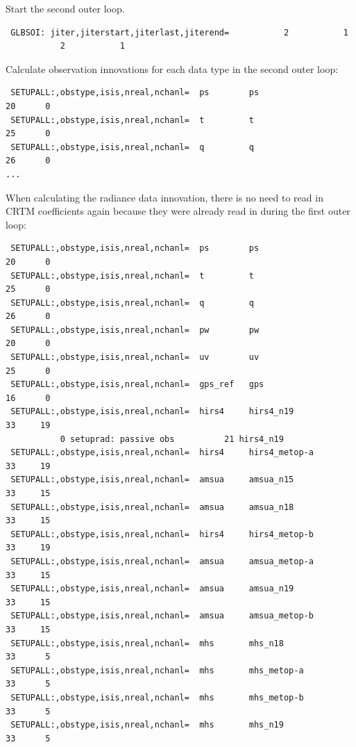 Start the second outer loop.
\begin{scriptsize}
\begin{verbatim}
 GLBSOI: jiter,jiterstart,jiterlast,jiterend=           2           1
           2           1
\end{verbatim}
\end{scriptsize}
Calculate observation innovations for each data type in the second outer loop:
\begin{scriptsize}
\begin{verbatim}
 SETUPALL:,obstype,isis,nreal,nchanl=  ps        ps                       20      0
 SETUPALL:,obstype,isis,nreal,nchanl=  t         t                        25      0
 SETUPALL:,obstype,isis,nreal,nchanl=  q         q                        26      0
...
\end{verbatim}
\end{scriptsize}

When calculating the radiance data innovation, there is no need to read in CRTM coefficients again because they were already read in during the first outer loop: 
\begin{scriptsize}
\begin{verbatim}
 SETUPALL:,obstype,isis,nreal,nchanl=  ps        ps                       20      0
 SETUPALL:,obstype,isis,nreal,nchanl=  t         t                        25      0
 SETUPALL:,obstype,isis,nreal,nchanl=  q         q                        26      0
 SETUPALL:,obstype,isis,nreal,nchanl=  pw        pw                       20      0
 SETUPALL:,obstype,isis,nreal,nchanl=  uv        uv                       25      0
 SETUPALL:,obstype,isis,nreal,nchanl=  gps_ref   gps                      16      0
 SETUPALL:,obstype,isis,nreal,nchanl=  hirs4     hirs4_n19                33     19
           0 setuprad: passive obs          21 hirs4_n19
 SETUPALL:,obstype,isis,nreal,nchanl=  hirs4     hirs4_metop-a            33     19
 SETUPALL:,obstype,isis,nreal,nchanl=  amsua     amsua_n15                33     15
 SETUPALL:,obstype,isis,nreal,nchanl=  amsua     amsua_n18                33     15
 SETUPALL:,obstype,isis,nreal,nchanl=  hirs4     hirs4_metop-b            33     19
 SETUPALL:,obstype,isis,nreal,nchanl=  amsua     amsua_metop-a            33     15
 SETUPALL:,obstype,isis,nreal,nchanl=  amsua     amsua_n19                33     15
 SETUPALL:,obstype,isis,nreal,nchanl=  amsua     amsua_metop-b            33     15
 SETUPALL:,obstype,isis,nreal,nchanl=  mhs       mhs_n18                  33      5
 SETUPALL:,obstype,isis,nreal,nchanl=  mhs       mhs_metop-a              33      5
 SETUPALL:,obstype,isis,nreal,nchanl=  mhs       mhs_metop-b              33      5
 SETUPALL:,obstype,isis,nreal,nchanl=  mhs       mhs_n19                  33      5
\end{verbatim}
\end{scriptsize}

